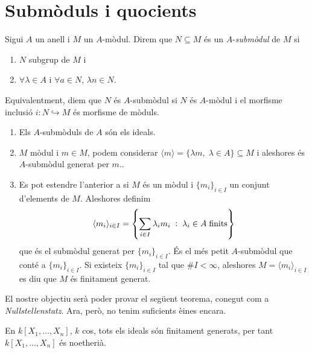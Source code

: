\documentclass[../../../main.tex]{subfiles}
\begin{document}
\section{Submòduls i quocients}


\begin{defi}
[Submòdul]\label{def:submodul}
Sigui $A$ un anell i $M$ un $A$-mòdul. Direm que $N\subseteq M$ és un $A$-\textit{submòdul} de $M$ si
\begin{enumerate}[(1)]
    \item $N$ subgrup de $M$ i
    \item $\forall \lambda\in A$ i $\forall a\in N$, $\lambda n\in N$.
\end{enumerate}
Equivalentment, diem que $N$ és $A$-submòdul si $N$ és $A$-mòdul i el morfisme inclusió $i:N\hookrightarrow M$ és morfisme de mòduls.
\end{defi}

\begin{ej}
\begin{enumerate}[(1)]
    \item Els $A$-submòduls de $A$ són els ideals.
    \item $M$ mòdul i $m\in M$, podem considerar $\langle m\rangle = \{\lambda m,\;\lambda\in A\}\subseteq M$ i aleshores és $A$-submòdul generat per $m$..
    \item Es pot estendre l'anterior a si $M$ és un mòdul i $\{m_i\}_{i\in I}$ un conjunt d'elements de $M$. Aleshores definim 
    \begin{equation}
        \notag
        \langle m_i\rangle_{i\in I} = \left\{\sum_{i\in I}\lambda_im_i\;:\;\lambda_i\in A\;\text{finits}\right\}
    \end{equation}
    que és el submòdul generat per $\{m_i\}_{i\in I}$. És el més petit $A$-submòdul que conté a $\{m_i\}_{i\in I}$. Si existeix $\{m_i\}_{i\in I}$ tal que $\#I<\infty$, aleshores $M = \langle m_i\rangle_{i\in I}$ es diu que $M$ és finitament generat.
\end{enumerate}
\end{ej}



El nostre objectiu serà poder provar el següent teorema, conegut com a \textit{Nullstellenstatz}. Ara, però, no tenim suficients èines encara. 

\begin{ter}
\label{ter:teoremabasehilbert} En $k[X_1,\ldots,X_n]$, $k$ cos, tots els ideals són finitament generats, per tant $k[X_1,\ldots,X_n]$ és noetherià.
\end{ter}
\end{document}
